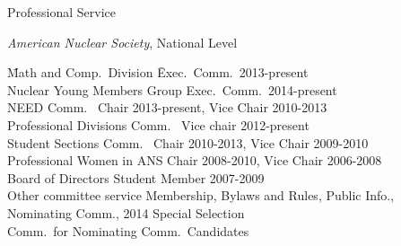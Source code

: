 \documentclass{resume2} %
\begin{document}

\begin{rSection}{Professional Service}

\textit{American Nuclear Society}, National Level
\begin{tabbing}
\hspace*{2 em}\= Math and Comp.\ Division \hspace*{10em} \= Exec.\ Comm.\ 2013-present \\
%
\> Nuclear Young Members Group \> Exec.\ Comm.\ 2014-present\\
%
\> NEED Comm.\ \> Chair 2013-present, Vice Chair 2010-2013\\
%
\> Professional Divisions Comm.\ \>	Vice chair 2012-present \\
%
\> Student Sections Comm.\ \> Chair 2010-2013, Vice Chair 2009-2010\\
%
\> Professional Women in ANS	\> Chair 2008-2010, Vice Chair 2006-2008\\	
%
\> Board of Directors \>	Student Member 2007-2009\\
%
\> Other committee service \>	Membership, Bylaws and Rules, Public Info., \\ \>  Nominating Comm., 2014 Special Selection \\ \> \> Comm.\ for Nominating Comm.\ Candidates
\end{tabbing}

%



\end{rSection}





\end{document}
